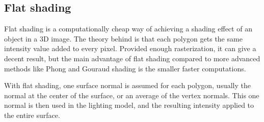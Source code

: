\subsection{Flat shading}

Flat shading is a computationally cheap way of achieving a shading effect of an
object in a 3D image. The theory behind is that each polygon gets the same
intensity value added to every pixel. Provided enough rasterization, it can
give a decent result, but the main advantage of flat shading compared to more
advanced methods like Phong and Gouraud shading is the smaller faster computations. 

With flat shading, one surface normal is assumed for each polygon, usually the
normal at the center of the surface, or an average of the vertex normals. This
one normal is then used in the lighting model, and the resulting intensity
applied to the entire surface.

